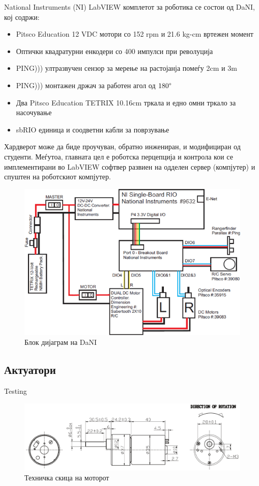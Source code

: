 \documentclass{article}
\begin{document}
National Instruments (NI) LabVIEW комплетот за роботика се состои од DaNI, кој содржи:
\begin{itemize}
	\item Pitsco Education 12 VDC мотори со 152 rpm и 21.6 kg-cm вртежен момент
	\item Оптички квадратурни енкодери со 400 импулси при револуција
	\item PING))) ултразвучен сензор за мерење на растојанја помеѓу 2cm и 3m
	\item PING))) монтажен држач за работен агол од $180 \degree$
	\item Два Pitsco Education TETRIX 10.16cm тркала и едно омни тркало за насочување
	\item sbRIO единица и соодветни кабли за поврзување
\end{itemize}
Хардверот може да биде проучуван, обратно инжениран, и модифициран од студенти. Меѓутоа, главната цел е роботска перцепција и контрола кои се имплементирани во LabVIEW софтвер развиен на одделен сервер (компјутер) и спуштен на роботскиот компјутер.

\begin{figure}[H]
\includegraphics[width=0.75\linewidth]{dani_block_diagram.png}
\centering
\caption{Блок дијаграм на DaNI}
\label{fig:dani_block_diagram.png}
\end{figure}

\subsection{Актуатори}
Testing
\begin{figure}[H]
\includegraphics[width=0.75\linewidth]{motor_schematic.png}
\centering
\caption{Техничка скица на моторот}
\label{fig:motor_schematic.png}
\end{figure}
\end{document}
